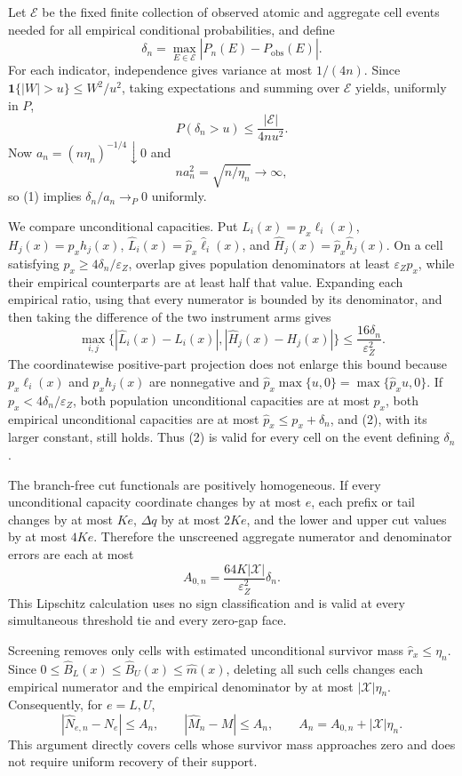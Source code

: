 Let \(\mathcal E\) be the fixed finite collection of observed atomic and aggregate cell events needed for all empirical conditional probabilities, and define
\[
\delta_n=\max_{E\in\mathcal E}|\widehat P_n(E)-P_{\mathrm{obs}}(E)|.
\]
For each indicator, independence gives variance at most \(1/(4n)\).  Since \(\mathbf 1\{|W|>u\}\le W^2/u^2\), taking expectations and summing over \(\mathcal E\) yields, uniformly in \(P\),
\[
P(\delta_n>u)\le\frac{|\mathcal E|}{4nu^2}.
\tag{1}
\]
Now \(a_n=(n\eta_n)^{-1/4}\downarrow0\) and
\[
na_n^2=\sqrt{n/\eta_n}\longrightarrow\infty,
\]
so (1) implies \(\delta_n/a_n\to_P0\) uniformly.

We compare unconditional capacities.  Put \(L_i(x)=p_x\ell_i(x)\), \(H_j(x)=p_xh_j(x)\), \(\widehat L_i(x)=\widehat p_x\widehat\ell_i(x)\), and \(\widehat H_j(x)=\widehat p_x\widehat h_j(x)\).  On a cell satisfying \(p_x\ge4\delta_n/\varepsilon_Z\), overlap gives population denominators at least \(\varepsilon_Zp_x\), while their empirical counterparts are at least half that value.  Expanding each empirical ratio, using that every numerator is bounded by its denominator, and then taking the difference of the two instrument arms gives
\[
\max_{i,j}\{|\widehat L_i(x)-L_i(x)|,|\widehat H_j(x)-H_j(x)|\}
\le\frac{16\delta_n}{\varepsilon_Z^2}.
\tag{2}
\]
The coordinatewise positive-part projection does not enlarge this bound because \(p_x\ell_i(x)\) and \(p_xh_j(x)\) are nonnegative and \(\widehat p_x\max\{u,0\}=\max\{\widehat p_xu,0\}\).  If \(p_x<4\delta_n/\varepsilon_Z\), both population unconditional capacities are at most \(p_x\), both empirical unconditional capacities are at most \(\widehat p_x\le p_x+\delta_n\), and (2), with its larger constant, still holds.  Thus (2) is valid for every cell on the event defining \(\delta_n\).

The branch-free cut functionals are positively homogeneous.  If every unconditional capacity coordinate changes by at most \(e\), each prefix or tail changes by at most \(Ke\), \(\Delta q\) by at most \(2Ke\), and the lower and upper cut values by at most \(4Ke\).  Therefore the unscreened aggregate numerator and denominator errors are each at most
\[
A_{0,n}=\frac{64K|\mathcal X|}{\varepsilon_Z^2}\delta_n.
\tag{3}
\]
This Lipschitz calculation uses no sign classification and is valid at every simultaneous threshold tie and every zero-gap face.

Screening removes only cells with estimated unconditional survivor mass \(\widehat r_x\le\eta_n\).  Since \(0\le\widehat B_L(x)\le\widehat B_U(x)\le\widehat m(x)\), deleting all such cells changes each empirical numerator and the empirical denominator by at most \(|\mathcal X|\eta_n\).  Consequently, for \(e=L,U\),
\[
|\widehat N_{e,n}-N_e|\le A_n,
\qquad
|\widehat M_n-M|\le A_n,
\qquad
A_n=A_{0,n}+|\mathcal X|\eta_n.
\tag{4}
\]
This argument directly covers cells whose survivor mass approaches zero and does not require uniform recovery of their support.

